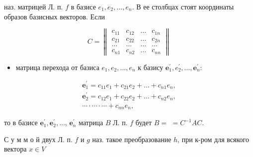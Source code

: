 \documentclass[10pt]{article}
\begin{document}
наз. матрицей Л. п. $f$ в базисе $e_{1}, e_{2}, \ldots, e_{n}$. В ее столбцах стоят координаты образов базисных векторов. Если



\[

C=\left\|\begin{array}{cccc}

c_{11} & c_{12} & \ldots & c_{1 n} \\

c_{21} & c_{22} & \ldots & c_{2 n} \\

\ldots & \ldots & \ldots & \ldots \\

c_{n 1} & c_{n 2} & \ldots & c_{n n}

\end{array}\right\|

\]



\begin{itemize}

  \item матрица перехода от базиса $e_{1}, e_{2}, \ldots, e_{n}$ к базису $\boldsymbol{e}_{1}^{\prime}, e_{2}^{\prime}, \ldots, \boldsymbol{e}_{n}^{\prime}:$

\end{itemize}



\[

\begin{gathered}

\boldsymbol{e}_{1}^{\prime}=c_{11} e_{1}+c_{21} e_{2}+\ldots+c_{n 1} e_{n}, \\

\boldsymbol{e}_{2}^{\prime}=c_{12} e_{1}+c_{22} e_{2}+\ldots+c_{n 2} e_{n}, \\

\cdots \cdot \cdots \cdot \cdots+c_{n n} e_{n},

\end{gathered}

\]



то в базисе $\boldsymbol{e}_{1}^{\prime}, \boldsymbol{e}_{2}^{\prime}, \ldots$, $\boldsymbol{e}_{n}^{\prime}$ матрица $B$ Л. п. $f$ будет $B=$ $=C^{-1} A C$.



С у м м о й двух Л. п. $f$ и $g$ наз. такое преобразование $h$, при к-ром для всякого вектора $x \in V$
\end{document}
